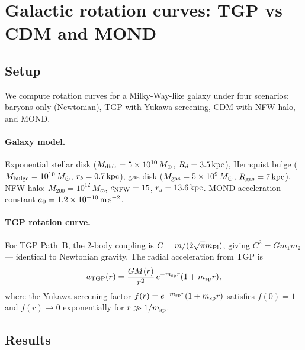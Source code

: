 \section{Galactic rotation curves: TGP vs CDM and MOND}
\label{sec:rotation_curve}

\subsection{Setup}

We compute rotation curves for a Milky-Way-like galaxy under four
scenarios: baryons only (Newtonian), TGP with Yukawa screening,
CDM with NFW halo, and MOND.

\paragraph{Galaxy model.}
Exponential stellar disk ($M_{\rm disk}=5\times10^{10}\,M_\odot$,
$R_d=3.5\,{\rm kpc}$), Hernquist bulge
($M_{\rm bulge}=10^{10}\,M_\odot$, $r_b=0.7\,{\rm kpc}$),
gas disk ($M_{\rm gas}=5\times10^9\,M_\odot$, $R_{\rm gas}=7\,{\rm kpc}$).
NFW halo: $M_{200}=10^{12}\,M_\odot$, $c_{\rm NFW}=15$,
$r_s=13.6\,{\rm kpc}$.
MOND acceleration constant $a_0=1.2\times10^{-10}\,{\rm m\,s}^{-2}$.

\paragraph{TGP rotation curve.}
For TGP Path~B, the 2-body coupling is $C=m/(2\sqrt{\pi}m_{\rm Pl})$,
giving $C^2=Gm_1m_2$ — identical to Newtonian gravity.
The radial acceleration from TGP is
\begin{equation}
  a_{\rm TGP}(r) = \frac{GM(r)}{r^2}\,e^{-m_{\rm sp}r}(1+m_{\rm sp}r),
\end{equation}
where the Yukawa screening factor $f(r)=e^{-m_{\rm sp}r}(1+m_{\rm sp}r)$
satisfies $f(0)=1$ and $f(r)\to0$ exponentially for $r\gg1/m_{\rm sp}$.

\subsection{Results}

